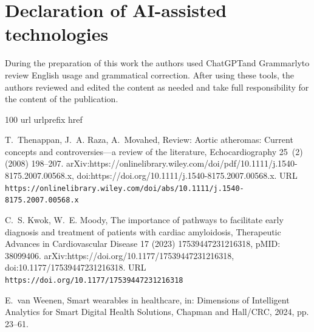 \documentclass[final,3p,times,twocolumn]{elsarticle}
\begin{document}
\section*{Declaration of AI-assisted technologies}

During the preparation of this work the authors used ChatGPT\texttrademark and Grammarly\texttrademark to review English usage and grammatical correction. After using these tools, the authors reviewed and edited the content as needed and take full responsibility for the content of the publication.



% 


\begin{thebibliography}{100}
\expandafter\ifx\csname url\endcsname\relax
  \def\url#1{\texttt{#1}}\fi
\expandafter\ifx\csname urlprefix\endcsname\relax\def\urlprefix{URL }\fi
\expandafter\ifx\csname href\endcsname\relax
  \def\href#1#2{#2} \def\path#1{#1}\fi

T.~Thenappan, J.~A. Raza, A.~Movahed,
  \href{https://onlinelibrary.wiley.com/doi/abs/10.1111/j.1540-8175.2007.00568.x}{Review:
  Aortic atheromas: Current concepts and controversies—a review of the
  literature}, Echocardiography 25~(2) (2008) 198--207.
\newblock \href
  {http://arxiv.org/abs/https://onlinelibrary.wiley.com/doi/pdf/10.1111/j.1540-8175.2007.00568.x}
  {\path{arXiv:https://onlinelibrary.wiley.com/doi/pdf/10.1111/j.1540-8175.2007.00568.x}},
  \href {https://doi.org/https://doi.org/10.1111/j.1540-8175.2007.00568.x}
  {\path{doi:https://doi.org/10.1111/j.1540-8175.2007.00568.x}}.
\newline\urlprefix\url{https://onlinelibrary.wiley.com/doi/abs/10.1111/j.1540-8175.2007.00568.x}

C.~S. Kwok, W.~E. Moody, \href{https://doi.org/10.1177/17539447231216318}{The
  importance of pathways to facilitate early diagnosis and treatment of
  patients with cardiac amyloidosis}, Therapeutic Advances in Cardiovascular
  Disease 17 (2023) 17539447231216318, pMID: 38099406.
\newblock \href
  {http://arxiv.org/abs/https://doi.org/10.1177/17539447231216318}
  {\path{arXiv:https://doi.org/10.1177/17539447231216318}}, \href
  {https://doi.org/10.1177/17539447231216318}
  {\path{doi:10.1177/17539447231216318}}.
\newline\urlprefix\url{https://doi.org/10.1177/17539447231216318}

E.~{van Weenen}, Smart wearables in healthcare, in: Dimensions of Intelligent
  Analytics for Smart Digital Health Solutions, Chapman and Hall/CRC, 2024, pp.
  23--61.


\end{thebibliography}
\end{document}
